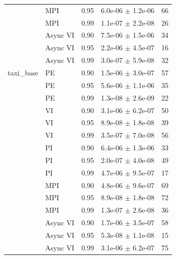 \begin{table}[t]
\begin{tabular}{llccc}
   & MPI & 0.95 & 6.0e-06 $\pm$ 1.2e-06 & 66 \\
   & MPI & 0.99 & 1.1e-07 $\pm$ 2.2e-08 & 26 \\
   & Async VI & 0.90 & 7.5e-06 $\pm$ 1.5e-06 & 34 \\
   & Async VI & 0.95 & 2.2e-06 $\pm$ 4.5e-07 & 16 \\
   & Async VI & 0.99 & 3.0e-07 $\pm$ 5.9e-08 & 32 \\
  taxi\_base & PE & 0.90 & 1.5e-06 $\pm$ 3.0e-07 & 57 \\
   & PE & 0.95 & 5.6e-06 $\pm$ 1.1e-06 & 35 \\
   & PE & 0.99 & 1.3e-08 $\pm$ 2.6e-09 & 22 \\
   & VI & 0.90 & 3.1e-06 $\pm$ 6.2e-07 & 50 \\
   & VI & 0.95 & 8.9e-08 $\pm$ 1.8e-08 & 39 \\
   & VI & 0.99 & 3.5e-07 $\pm$ 7.0e-08 & 56 \\
   & PI & 0.90 & 6.4e-06 $\pm$ 1.3e-06 & 33 \\
   & PI & 0.95 & 2.0e-07 $\pm$ 4.0e-08 & 49 \\
   & PI & 0.99 & 4.7e-06 $\pm$ 9.5e-07 & 17 \\
   & MPI & 0.90 & 4.8e-06 $\pm$ 9.6e-07 & 69 \\
   & MPI & 0.95 & 8.9e-08 $\pm$ 1.8e-08 & 72 \\
   & MPI & 0.99 & 1.3e-07 $\pm$ 2.6e-08 & 36 \\
   & Async VI & 0.90 & 1.7e-06 $\pm$ 3.5e-07 & 58 \\
   & Async VI & 0.95 & 5.3e-08 $\pm$ 1.1e-08 & 15 \\
   & Async VI & 0.99 & 3.1e-06 $\pm$ 6.2e-07 & 75 \\
\bottomrule
\end{tabular}
\end{table}


